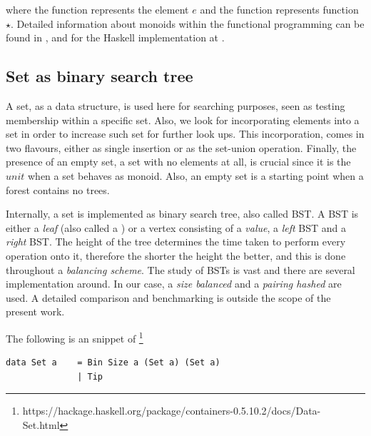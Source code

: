 \documentclass{elsarticle}
\newcommand{\code}[1]{\haskell{#1}}
\begin{document}
where the function \code{mempty} represents the element $e$ and the function \code{mappend} represents function $\star$. Detailed information about monoids within the functional programming can be found in \cite{Monoids}, and for the Haskell implementation at \cite{HaskellMonoid}.


\subsection{Set as binary search tree} 

A set, as a data structure, is used here for searching purposes, seen as testing membership within a specific set. Also, we look for incorporating elements into a set in order to increase such set for further look ups. This incorporation, comes in two flavours, either as single insertion or as the set-union operation. Finally, the presence of an empty set, a set with no elements at all, is crucial since it is the $unit$ when a set behaves as monoid. Also, an empty set is a starting point when a forest contains no trees.

Internally, a set is implemented as binary search tree, also called BST. A BST is either a \textit{leaf} (also called a \code{tip}) or a vertex consisting of a \textit{value}, a \textit{left} BST and a \textit{right} BST. The height of the tree determines the time taken to perform every operation onto it, therefore the shorter the height the better, and this is done throughout a \textit{balancing scheme}. The study of BSTs is vast and there are several implementation around. In our case, a \textit{size balanced} and a \textit{pairing hashed} are used. A detailed comparison and benchmarking is outside the scope of the present work.

The following is an snippet of \code{Data.Set} \footnote{https://hackage.haskell.org/package/containers-0.5.10.2/docs/Data-Set.html}
\begin{lstlisting}
data Set a    = Bin Size a (Set a) (Set a)
              | Tip
\end{lstlisting}              
\end{document}

